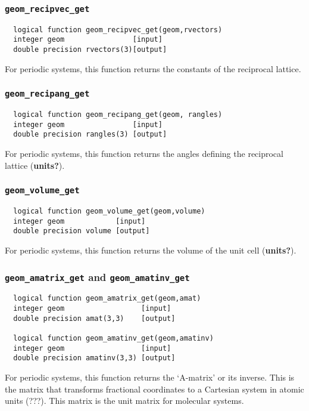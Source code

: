 \subsubsection{{\tt geom\_recipvec\_get}}
\begin{verbatim}
  logical function geom_recipvec_get(geom,rvectors)
  integer geom                [input]
  double precision rvectors(3)[output]
\end{verbatim}
For periodic systems, this function returns the constants of 
the reciprocal lattice.

\subsubsection{{\tt geom\_recipang\_get}}
\begin{verbatim}
  logical function geom_recipang_get(geom, rangles)
  integer geom                [input]
  double precision rangles(3) [output]
\end{verbatim}
For periodic systems, this function returns the angles defining the reciprocal
lattice ({\bf units?}).

\subsubsection{{\tt geom\_volume\_get}}
\begin{verbatim}
  logical function geom_volume_get(geom,volume)
  integer geom            [input]
  double precision volume [output]
\end{verbatim}
For periodic systems, this function returns the volume of the unit cell ({\bf units?}).

\subsubsection{{\tt geom\_amatrix\_get} and {\tt geom\_amatinv\_get}}
\begin{verbatim}
  logical function geom_amatrix_get(geom,amat)
  integer geom                  [input]
  double precision amat(3,3)    [output]

  logical function geom_amatinv_get(geom,amatinv)
  integer geom                  [input]
  double precision amatinv(3,3) [output]
\end{verbatim}
For periodic systems, this function returns the `A-matrix' or its inverse.  This is
the matrix that transforms fractional coordinates to a Cartesian
system in atomic units (???).  This matrix is the unit matrix for
molecular systems.

